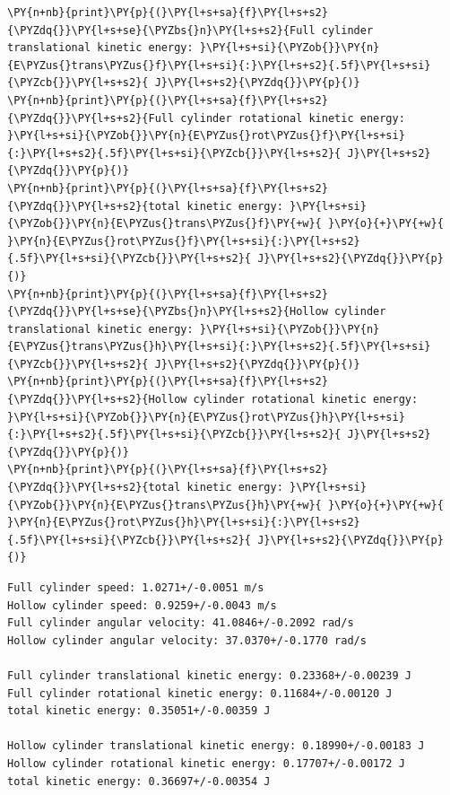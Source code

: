 \begin{tcolorbox}[breakable, size=fbox, boxrule=1pt, pad at break*=1mm,colback=cellbackground, colframe=cellborder]
\begin{Verbatim}[commandchars=\\\{\}]
\PY{n+nb}{print}\PY{p}{(}\PY{l+s+sa}{f}\PY{l+s+s2}{\PYZdq{}}\PY{l+s+se}{\PYZbs{}n}\PY{l+s+s2}{Full cylinder translational kinetic energy: }\PY{l+s+si}{\PYZob{}}\PY{n}{E\PYZus{}trans\PYZus{}f}\PY{l+s+si}{:}\PY{l+s+s2}{.5f}\PY{l+s+si}{\PYZcb{}}\PY{l+s+s2}{ J}\PY{l+s+s2}{\PYZdq{}}\PY{p}{)}
\PY{n+nb}{print}\PY{p}{(}\PY{l+s+sa}{f}\PY{l+s+s2}{\PYZdq{}}\PY{l+s+s2}{Full cylinder rotational kinetic energy: }\PY{l+s+si}{\PYZob{}}\PY{n}{E\PYZus{}rot\PYZus{}f}\PY{l+s+si}{:}\PY{l+s+s2}{.5f}\PY{l+s+si}{\PYZcb{}}\PY{l+s+s2}{ J}\PY{l+s+s2}{\PYZdq{}}\PY{p}{)}
\PY{n+nb}{print}\PY{p}{(}\PY{l+s+sa}{f}\PY{l+s+s2}{\PYZdq{}}\PY{l+s+s2}{total kinetic energy: }\PY{l+s+si}{\PYZob{}}\PY{n}{E\PYZus{}trans\PYZus{}f}\PY{+w}{ }\PY{o}{+}\PY{+w}{ }\PY{n}{E\PYZus{}rot\PYZus{}f}\PY{l+s+si}{:}\PY{l+s+s2}{.5f}\PY{l+s+si}{\PYZcb{}}\PY{l+s+s2}{ J}\PY{l+s+s2}{\PYZdq{}}\PY{p}{)}
\PY{n+nb}{print}\PY{p}{(}\PY{l+s+sa}{f}\PY{l+s+s2}{\PYZdq{}}\PY{l+s+se}{\PYZbs{}n}\PY{l+s+s2}{Hollow cylinder translational kinetic energy: }\PY{l+s+si}{\PYZob{}}\PY{n}{E\PYZus{}trans\PYZus{}h}\PY{l+s+si}{:}\PY{l+s+s2}{.5f}\PY{l+s+si}{\PYZcb{}}\PY{l+s+s2}{ J}\PY{l+s+s2}{\PYZdq{}}\PY{p}{)}
\PY{n+nb}{print}\PY{p}{(}\PY{l+s+sa}{f}\PY{l+s+s2}{\PYZdq{}}\PY{l+s+s2}{Hollow cylinder rotational kinetic energy: }\PY{l+s+si}{\PYZob{}}\PY{n}{E\PYZus{}rot\PYZus{}h}\PY{l+s+si}{:}\PY{l+s+s2}{.5f}\PY{l+s+si}{\PYZcb{}}\PY{l+s+s2}{ J}\PY{l+s+s2}{\PYZdq{}}\PY{p}{)}
\PY{n+nb}{print}\PY{p}{(}\PY{l+s+sa}{f}\PY{l+s+s2}{\PYZdq{}}\PY{l+s+s2}{total kinetic energy: }\PY{l+s+si}{\PYZob{}}\PY{n}{E\PYZus{}trans\PYZus{}h}\PY{+w}{ }\PY{o}{+}\PY{+w}{ }\PY{n}{E\PYZus{}rot\PYZus{}h}\PY{l+s+si}{:}\PY{l+s+s2}{.5f}\PY{l+s+si}{\PYZcb{}}\PY{l+s+s2}{ J}\PY{l+s+s2}{\PYZdq{}}\PY{p}{)}
\end{Verbatim}
\end{tcolorbox}

    \begin{Verbatim}[commandchars=\\\{\}]
Full cylinder speed: 1.0271+/-0.0051 m/s
Hollow cylinder speed: 0.9259+/-0.0043 m/s
Full cylinder angular velocity: 41.0846+/-0.2092 rad/s
Hollow cylinder angular velocity: 37.0370+/-0.1770 rad/s

Full cylinder translational kinetic energy: 0.23368+/-0.00239 J
Full cylinder rotational kinetic energy: 0.11684+/-0.00120 J
total kinetic energy: 0.35051+/-0.00359 J

Hollow cylinder translational kinetic energy: 0.18990+/-0.00183 J
Hollow cylinder rotational kinetic energy: 0.17707+/-0.00172 J
total kinetic energy: 0.36697+/-0.00354 J
    \end{Verbatim}

    \begin{tcolorbox}[breakable, size=fbox, boxrule=1pt, pad at break*=1mm,colback=cellbackground, colframe=cellborder]
\begin{Verbatim}[commandchars=\\\{\}]

\end{Verbatim}
\end{tcolorbox}

